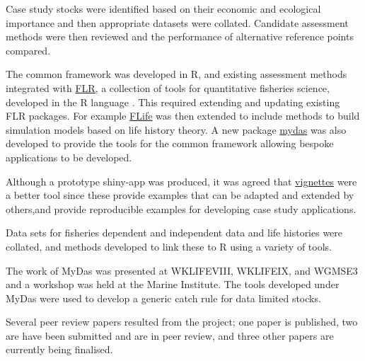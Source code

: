 Case study stocks were identified based on their economic and ecological importance and then appropriate datasets were collated. Candidate assessment methods were then reviewed and the performance of alternative reference points compared. 

The common framework was developed in R, and existing assessment methods integrated with \href{http://www.flr-project.org/}{FLR}, a collection of tools for quantitative fisheries science, developed in the R language \citep{kell2007flr}. This required extending and updating existing FLR packages. For example \href{https://github.com/flr/flife}{FLife}
was then extended to include methods to build simulation models based on life history theory. A new package \href{https://github.com/flr/mydas/wiki}{mydas} was also developed to provide the tools for the common framework allowing bespoke applications to be developed.
 
Although a prototype shiny-app was produced, it was agreed that \href{https://3o2y9wugzp1kfxr5hvzgzq-on.drv.tw/MyDas/doc/html/mydas_vignettes.html}{vignettes} were a better tool since these provide examples that can be adapted and extended by others,and provide reproducible examples for developing case study applications.

Data sets for fisheries dependent and independent data and life histories were collated, and methods developed to link these to R using a variety of tools.

The work of MyDas was presented at WKLIFEVIII, WKLIFEIX, and WGMSE3 and a workshop was held at the Marine Institute. The tools developed under MyDas were used to develop a generic catch rule for data limited stocks.

Several peer review papers resulted from the project;  one paper is published, two are have been submitted and are in peer review, and three other papers are currently being finalised.


